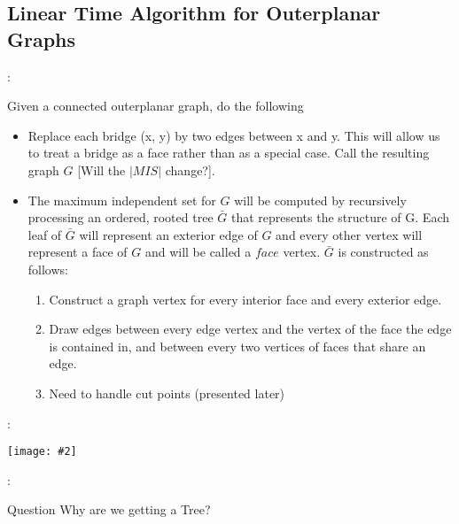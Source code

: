 \documentclass{beamer}
\newcommand{\iph}[2]{
    \texttt{[image: \#2]}
}
\begin{document}
\subsection{Linear Time Algorithm for Outerplanar Graphs}
\begin{frame}{\secname : \subsecname}
    \begin{block}{Given a connected outerplanar graph, do the following}
    \begin{itemize}
        \item Replace each bridge (x, y) by two
        edges between x and y. This will allow us to treat a bridge as a face rather
        than as a special case. Call the resulting graph $G$ [Will the $|MIS|$ change?].

        \item The maximum independent set for $G$ will be computed by recursively
processing an ordered, rooted tree $\bar{G}$ that represents the structure of G. Each
leaf of $\bar{G}$ will represent an exterior edge of $G$ and every other vertex will represent
a face of $G$ and will be called a $face$ vertex. $\bar{G}$ is constructed as follows:
        \begin{enumerate}
        \item Construct a graph vertex for every interior face and
        every exterior edge.

        \item Draw edges between every edge vertex and the vertex of the face the edge is contained in, and between
        every two vertices of faces that share an edge.

        \item Need to handle cut points (presented later)      
        \end{enumerate}
    \end{itemize}
    \end{block}

\end{frame}



\begin{frame}{\secname : \subsecname}
        \iph{0.9}{lin1}

\end{frame}

\begin{frame}{\secname : \subsecname}
    \begin{block}{Question}
        Why are we getting a Tree? 
    \end{block}

\end{frame}
\end{document}
